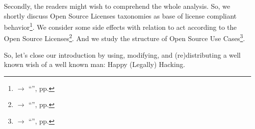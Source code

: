 Secondly, the readers might wish to comprehend the whole analysis. So, we
shortly discuss Open Source Licenses taxonomies as base of license compliant
behavior\footnote{$\rightarrow$ \enquote{}, pp.
\pageref{sec:LicenseTaxonomies}}. We consider some side effects with
relation to act according to the Open Source Licenses\footnote{$\rightarrow$
\enquote{}, pp. \pageref{sec:SideEffects}}. And we
study the structure of Open Source Use Cases\footnote{$\rightarrow$
\enquote{}, pp. \pageref{sec:OSUCdeduction}}.

So, let's close our introduction by using, modifying, and (re)distributing a well
known wish of a well known man: Happy (Legally) Hacking.

%

